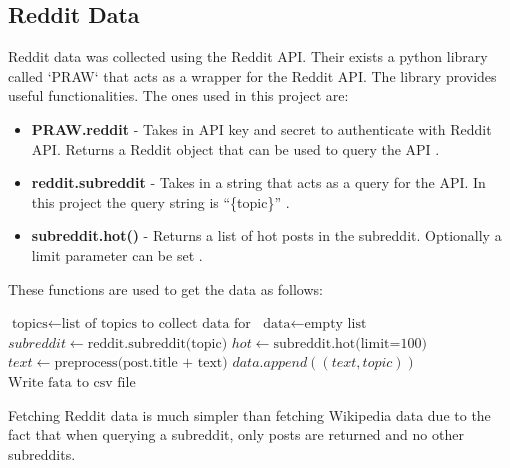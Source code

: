 \subsection{Reddit Data}
Reddit data was collected using the Reddit API. Their exists a python library called `PRAW` \cite{praw} that acts as a wrapper for the Reddit API.
The library provides useful functionalities. The ones used in this project are:
\begin{itemize}
    \item \textbf{PRAW.reddit} - Takes in API key and secret to authenticate with Reddit API. Returns a Reddit object that can be used to query the API \cite{praw}.
    \item \textbf{reddit.subreddit} - Takes in a string that acts as a query for the API. In this project the query string is ``\{topic\}'' \cite{praw}.
    \item \textbf{subreddit.hot()} - Returns a list of hot posts in the subreddit. Optionally a limit parameter can be set \cite{praw}.
\end{itemize}
These functions are used to get the data as follows:
\begin{algorithm}
    \caption{$\text{Algorithm to Retrieve Reddit Data}$}\label{alg:reddit-data}
    \begin{algorithmic}
        \STATE $\text{topics} \gets \text{list of topics to collect data for}$
        \STATE $\text{data} \gets \text{empty list}$
            \STATE $subreddit \gets \text{reddit.subreddit(topic)}$
            \STATE $hot \gets \text{subreddit.hot(limit=100)}$
                \STATE $text \gets \text{preprocess(post.title + text)}$
                \STATE $data.append((text, topic))$
            \ENDFOR
        \ENDFOR
        \STATE $\text{Write fata to csv file}$
    \end{algorithmic}
\end{algorithm}
Fetching Reddit data is much simpler than fetching Wikipedia data due to the fact that when querying a subreddit, only posts are returned and no other subreddits.

